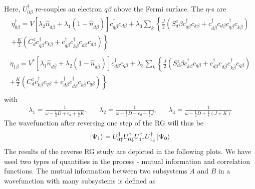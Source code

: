\documentclass[twoside]{report}
\numberwithin{equation}{section}
\begin{document}
Here, \(U^\dagger_{0\beta}\) re-couples an electron \(q\beta\) above the Fermi surface. The \(\eta\)-s are
\begin{equation}\begin{aligned}
	\eta_{0\beta}^\dagger = V \left[\lambda_2 \hat n_{d\overline\beta} + \lambda_1 \left( 1 - \hat n_{d\overline\beta} \right)  \right]c^\dagger_{q\beta}c_{d\beta} + \lambda_3 \sum_{k} \left\{ \frac{J}{2}\left( S_d^z \beta c^\dagger_{q\beta}c_{k\beta} + c^\dagger_{d\overline\beta}c_{d\beta}c^\dagger_{q\beta}c_{k\overline\beta}\right) \right.\\
	+ \left.\frac{K}{2}\left( C^z_d c^\dagger_{q\beta}c_{k\beta} + c^\dagger_{q\beta}c^\dagger_{k\overline\beta}c_{d\overline\beta}c_{d\beta} \right) \right\} \\
\end{aligned}\end{equation}
\begin{equation}\begin{aligned}
	\eta_{1\beta} = V^* \left[\lambda_1 \hat n_{d\overline\beta} + \lambda_2 \left( 1 - \hat n_{d\overline\beta} \right)  \right]c^\dagger_{d\beta}c_{q\beta} + \lambda_3 \sum_{k} \left\{ \frac{J}{2}\left( S_d^z \beta c^\dagger_{k\beta}c_{q\beta} + c^\dagger_{d\beta}c_{d\overline\beta}c^\dagger_{k\overline\beta}c_{q\beta}\right) \right.\\
	+ \left.\frac{K}{2}\left( C^z_d c^\dagger_{k\beta}c_{q\beta} + c^\dagger_{d\beta}c^\dagger_{d\overline\beta}c_{k\overline\beta}c_{q\beta} \right) \right\} \\
\end{aligned}\end{equation}
with
\begin{equation}\begin{aligned}
	\lambda_1 = \frac{1}{\omega - \frac{1}{2}D + \epsilon_d + \frac{1}{2}K}, && \lambda_2 = \frac{1}{\omega - \frac{1}{2}D - \epsilon_d + \frac{1}{2}J}, && \lambda_3 = \frac{1}{\omega - \frac{1}{2}D + \frac{1}{4}\left(J + K\right)} 
\end{aligned}\end{equation}
The wavefunction after reversing one step of the RG will thus be
\begin{equation}\begin{aligned}
	\ket{\Psi_1} = U^\dagger_{0 \uparrow}U^\dagger_{0 \downarrow}U^\dagger_{1 \uparrow}U^\dagger_{1 \downarrow}\ket{\Psi_0}
\end{aligned}\end{equation}
The results of the reverse RG study are depicted in the following plots. We have used two types of quantities in the process - mutual information and correlation functions. The mutual information between two subsystems \(A\) and \(B\) in a wavefunction with many subsystems is defined as
\end{document}
